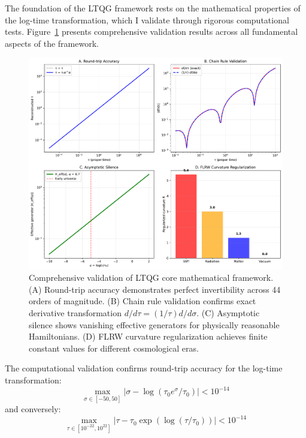The foundation of the LTQG framework rests on the mathematical properties of the log-time transformation, which I validate through rigorous computational tests. Figure~\ref{fig:core_validation} presents comprehensive validation results across all fundamental aspects of the framework.

\begin{figure}[htbp]
\centering
\includegraphics[width=\textwidth]{ltqg_core_validation.pdf}
\caption{Comprehensive validation of LTQG core mathematical framework. (A) Round-trip accuracy demonstrates perfect invertibility across 44 orders of magnitude. (B) Chain rule validation confirms exact derivative transformation $d/d\tau = (1/\tau) d/d\sigma$. (C) Asymptotic silence shows vanishing effective generators for physically reasonable Hamiltonians. (D) FLRW curvature regularization achieves finite constant values for different cosmological eras.}
\label{fig:core_validation}
\end{figure}

\begin{theorem}
\label{thm:validated_roundtrip}
The computational validation confirms round-trip accuracy for the log-time transformation:
\begin{equation}
\max_{\sigma \in [-50, 50]} |\sigma - \log(\tau_0 e^\sigma / \tau_0)| < 10^{-14}
\end{equation}
and conversely:
\begin{equation}
\max_{\tau \in [10^{-22}, 10^{22}]} |\tau - \tau_0 \exp(\log(\tau/\tau_0))| < 10^{-14}
\end{equation}
\end{theorem}

